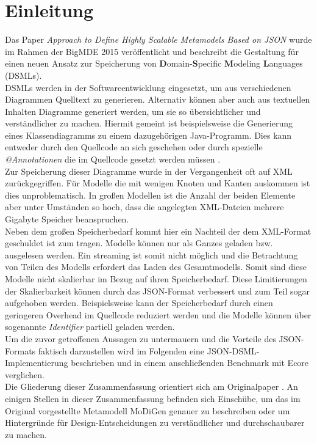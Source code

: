 \section{Einleitung}
Das Paper \textit{\glqq Approach to Define Highly Scalable Metamodels Based on JSON\grqq}\cite{gerhart2015approach} wurde im Rahmen der BigMDE 2015 veröffentlicht und beschreibt die Gestaltung für einen neuen Ansatz zur Speicherung von \textbf{D}omain-\textbf{S}pecific \textbf{M}odeling \textbf{L}anguages (DSMLs). \\
DSMLs werden in der Softwareentwicklung eingesetzt, um aus verschiedenen Diagrammen Quelltext zu generieren. Alternativ können aber auch aus textuellen Inhalten Diagramme generiert werden, um sie so übersichtlicher und verständlicher zu machen. Hiermit gemeint ist beispielsweise die Generierung eines Klassendiagramms zu einem dazugehörigen Java-Programm. Dies kann entweder durch den Quellcode an sich geschehen oder durch spezielle \textit{@Annotationen} die im Quellcode gesetzt werden müssen \cite{france2005domain}. \\
Zur Speicherung dieser Diagramme wurde in der Vergangenheit oft auf XML zurückgegriffen. Für Modelle die mit wenigen Knoten und Kanten auskommen ist dies unproblematisch. In großen Modellen ist die Anzahl der beiden Elemente aber unter Umständen so hoch, dass die angelegten XML-Dateien mehrere Gigabyte Speicher beanspruchen.\\ 
Neben dem großen Speicherbedarf kommt hier ein Nachteil der dem XML-Format geschuldet ist zum tragen. Modelle können nur als Ganzes geladen bzw. ausgelesen werden. Ein streaming ist somit nicht möglich und die Betrachtung von Teilen des Modells erfordert das Laden des Gesamtmodells. Somit sind diese Modelle nicht skalierbar im Bezug auf ihren Speicherbedarf. Diese Limitierungen der Skalierbarkeit können durch das JSON-Format verbessert und zum Teil sogar aufgehoben werden. Beispielsweise kann der Speicherbedarf durch einen geringeren Overhead im Quellcode reduziert werden und die Modelle können über sogenannte \textit{Identifier} partiell geladen werden. \\
Um die zuvor getroffenen Aussagen zu untermauern und die Vorteile des JSON-Formats faktisch darzustellen wird im Folgenden eine JSON-DSML-Implementierung beschrieben und in einem anschließenden Benchmark mit Ecore verglichen. \\
Die Gliederung dieser Zusammenfassung orientiert sich am Originalpaper \cite{gerhart2015approach}. An einigen Stellen in dieser Zusammenfassung befinden sich Einschübe, um das im Original vorgestellte Metamodell MoDiGen genauer zu beschreiben oder um Hintergründe für Design-Entscheidungen zu verständlicher und durchschaubarer zu machen. 



